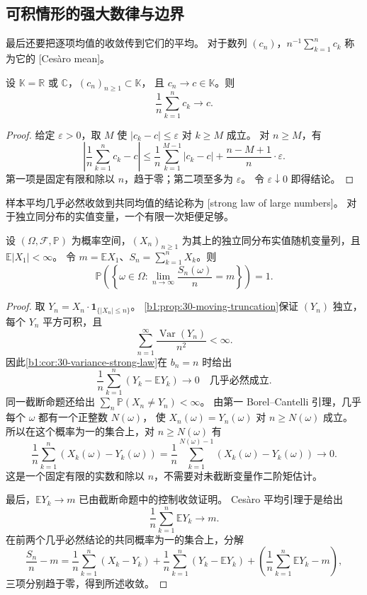 \subsection{可积情形的强大数律与边界}
\label{b1:subsec:300504}

最后还要把逐项均值的收敛传到它们的平均。
对于数列 \((c_n)\)，\(n^{-1}\sum_{k=1}^nc_k\) 称为它的
[Cesàro mean]。

\begin{lemma}[Cesàro 平均]
\label{b1:lem:30-cesaro}
设 \(\mathbb K=\mathbb R\) 或 \(\mathbb C\)，\((c_n)_{n\geq1}\subset\mathbb K\)，
且 \(c_n\to c\in\mathbb K\)。则
\[
 \frac1n\sum_{k=1}^nc_k\longrightarrow c.
\]
\end{lemma}
\begin{proof}
给定 \(\varepsilon>0\)，取 \(M\) 使 \(|c_k-c|\leq\varepsilon\) 对 \(k\geq M\) 成立。
对 \(n\geq M\)，有
\[
 \left|\frac1n\sum_{k=1}^nc_k-c\right|
 \leq\frac1n\sum_{k=1}^{M-1}|c_k-c|
       +\frac{n-M+1}{n}\cdot\varepsilon.
\]
第一项是固定有限和除以 \(n\)，趋于零；第二项至多为 \(\varepsilon\)。
令 \(\varepsilon\downarrow0\) 即得结论。
\end{proof}

样本平均几乎必然收敛到共同均值的结论称为
[strong law of large numbers]。
对于独立同分布的实值变量，一个有限一次矩便足够。

\begin{theorem}[可积独立同分布变量的强大数定律]
\label{b1:thm:30-iid-strong-law}
设 \((\Omega,\mathcal F,\mathbb P)\) 为概率空间，\((X_n)_{n\geq1}\)
为其上的独立同分布实值随机变量列，且 \(\mathbb E|X_1|<\infty\)。
令 \(m=\mathbb E X_1\)、\(S_n=\sum_{k=1}^nX_k\)。则
\[
 \mathbb P\left(\left\{\omega\in\Omega:
       \lim_{n\to\infty}\frac{S_n(\omega)}n=m\right\}\right)=1.
\]
\end{theorem}
\begin{proof}
取 \(Y_n=X_n\cdot\mathbf1_{\{|X_n|\leq n\}}\)。
\cref{b1:prop:30-moving-truncation}保证 \((Y_n)\) 独立，每个 \(Y_n\) 平方可积，且
\[
 \sum_{n=1}^\infty\frac{\operatorname{Var}(Y_n)}{n^2}<\infty.
\]
因此\cref{b1:cor:30-variance-strong-law}在 \(b_n=n\) 时给出
\[
 \frac1n\sum_{k=1}^n(Y_k-\mathbb E Y_k)\longrightarrow0
 \quad\text{几乎必然成立}.
\]
同一截断命题还给出 \(\sum_n\mathbb P(X_n\ne Y_n)<\infty\)。
由第一 Borel--Cantelli 引理，几乎每个 \(\omega\) 都有一个正整数 \(N(\omega)\)，
使 \(X_n(\omega)=Y_n(\omega)\) 对 \(n\geq N(\omega)\) 成立。
所以在这个概率为一的集合上，对 \(n\geq N(\omega)\) 有
\[
 \frac1n\sum_{k=1}^n(X_k(\omega)-Y_k(\omega))
 =\frac1n\sum_{k=1}^{N(\omega)-1}(X_k(\omega)-Y_k(\omega))
 \longrightarrow0.
\]
这是一个固定有限的实数和除以 \(n\)，不需要对未截断变量作二阶矩估计。

最后，\(\mathbb E Y_k\to m\) 已由截断命题中的控制收敛证明。
Cesàro 平均引理于是给出
\[
 \frac1n\sum_{k=1}^n\mathbb E Y_k\longrightarrow m.
\]
在前两个几乎必然结论的共同概率为一的集合上，分解
\[
 \frac{S_n}{n}-m
 =\frac1n\sum_{k=1}^n(X_k-Y_k)
  +\frac1n\sum_{k=1}^n(Y_k-\mathbb E Y_k)
  +\left(\frac1n\sum_{k=1}^n\mathbb E Y_k-m\right),
\]
三项分别趋于零，得到所述收敛。
\end{proof}

